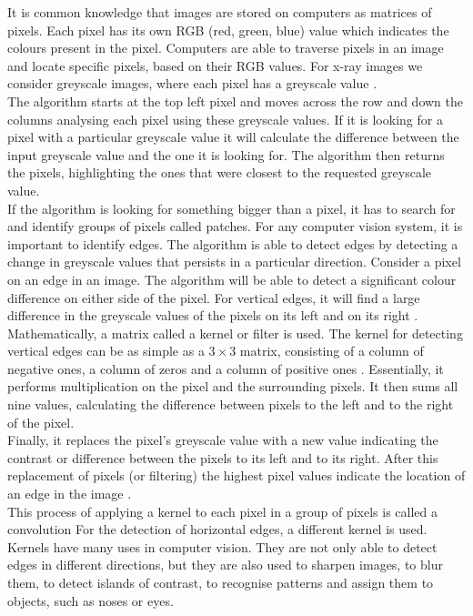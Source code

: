 It is common knowledge that images are stored on computers as matrices of pixels. Each pixel has its own RGB (red, green, blue) value which indicates the colours present in the pixel. Computers are able to traverse pixels in an image and locate specific pixels, based on their RGB values.  For x-ray images we consider greyscale images, where each pixel has a greyscale value \cite{9}.\newline
\\
The algorithm starts at the top left pixel and moves across the row and down the columns analysing each pixel using these greyscale values. If it is looking for a pixel with a particular greyscale value it will calculate the difference between the input greyscale value and the one it is looking for. The algorithm then returns the pixels, highlighting the ones that were closest to the requested greyscale value. \newline
\\
If the algorithm is looking for something bigger than a pixel, it has to search for and identify groups of pixels called patches. For any computer vision system, it is important to identify edges. The algorithm is able to detect edges by detecting a change in greyscale values that persists in a particular direction. Consider a pixel on an edge in an image. The algorithm will be able to detect a significant colour difference on either side of the pixel. For vertical edges, it will find a large difference in the greyscale values of the pixels on its left and on its right \cite{9}.\newline 
\\
Mathematically, a matrix called a kernel or filter is used. The kernel for detecting vertical edges can be as simple as a $3\times3$ matrix, consisting of a column of negative ones, a column of zeros and a column of positive ones \cite{9}. Essentially, it performs multiplication on the pixel and the surrounding pixels. It then sums all nine values, calculating the difference between pixels to the left and to the right of the pixel.\newline
\\
Finally, it replaces the pixel’s greyscale value with a new value indicating the contrast or difference between the pixels to its left and to its right. After this replacement of pixels (or filtering) the highest pixel values indicate the location of an edge in the image \cite{9}.\newline
\\
This process of applying a kernel to each pixel in a group of pixels is called a convolution \cite{9} For the detection of horizontal edges, a different kernel is used. Kernels have many uses in computer vision. They are not only able to detect edges in different directions, but they are also used to sharpen images, to blur them, to detect islands of contrast\cite{9}, to recognise patterns and assign them to objects, such as noses or eyes. \newline
